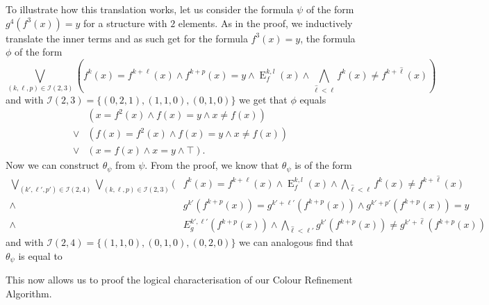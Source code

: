 To illustrate how this translation works, let us consider the formula $\psi$ of the form $g^4(f^3(x))=y$ for a structure with $2$ elements.
As in the proof, we inductively translate the inner terms and as such get for the formula $f^3(x)=y$, the formula $\phi$ of the form
$$\bigvee_{(k,\ell,p)\in \mathcal I(2,3)}\left(f^k(x)=f^{k+\ell}(x)\land f^{k+p}(x)=y \land \operatorname{E}^{k,l}_f(x)\land\bigwedge_{\hat \ell < \ell} f^k(x)\neq f^{k+\hat\ell}(x)\right)$$
and with $\mathcal I(2,3)=\{(0,2,1),(1,1,0),(0,1,0)\}$ we get that $\phi$ equals
\begin{align*}
	\phantom{\lor}&\left(x=f^2(x) \land f(x)=y \land x\neq f(x)\right) \\
	\lor & \left(f(x)=f^2(x) \land f(x)=y \land x \neq f(x)\right) \\
	\lor & \left(x=f(x) \land x=y \land \top\right).
\end{align*}
Now we can construct $\theta_\psi$ from $\psi$. 
From the proof, we know that $\theta_\psi$ is of the form
\begin{align*}
	\bigvee_{(k',\ell',p')\in \mathcal I(2,4)}\bigvee_{(k,\ell,p)\in \mathcal I(2,3)} ( &f^k(x)=f^{k+\ell}(x)\land \operatorname{E}^{k,l}_f(x)\land\bigwedge_{\hat{\ell}<\ell}f^k(x)\neq f^{k+\hat\ell}(x) \\
	\land & g^{k'}(f^{k+p}(x))=g^{k'+\ell'}(f^{k+p}(x)) \land g^{k'+p'}(f^{k+p}(x)) = y \\
	\land & E^{k',\ell'}_g(f^{k+p}(x)) \land \bigwedge_{\hat{\ell}<\ell'}g^{k'}(f^{k+p}(x))\neq g^{k'+\hat\ell}(f^{k+p}(x))
\end{align*}
and with $\mathcal I(2,4)=\{(1,1,0),(0,1,0), (0,2,0)\}$ we can analogous find that $\theta_\psi$ is equal to

This now allows us to proof the logical characterisation of our Colour Refinement Algorithm.

